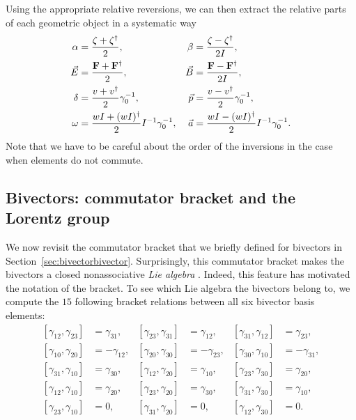 \documentclass[1p,sort&compress]{elsarticle}
\numberwithin{equation}{section}
\newcommand{\rv}[1]{\vec{#1}}
\newcommand{\bv}[1]{\mathbf{#1}}
\begin{document}
Using the appropriate relative reversions, we can then extract the relative parts of each geometric object in a systematic way
\begin{align}
  \alpha &= \frac{\zeta + \zeta^\dagger}{2}, & \beta &= \frac{\zeta - \zeta^\dagger}{2 I}, \\ \relax
  \rv{E} &= \frac{\bv{F} + \bv{F}^\dagger}{2}, & \rv{B} &= \frac{\bv{F} - \bv{F}^\dagger}{2 I}, \nonumber \\ \relax
  \delta &= \frac{v + v^\dagger}{2} \gamma_0^{-1}, & \rv{p} &= \frac{v - v^\dagger}{2}\gamma_0^{-1}, \nonumber \\ \relax
  \omega &= \frac{wI + (wI)^\dagger}{2}I^{-1}\gamma_0^{-1}, & \rv{a} &= \frac{wI - (wI)^\dagger}{2}I^{-1}\gamma_0^{-1}. \nonumber 
\end{align}
Note that we have to be careful about the order of the inversions in the case when elements do not commute.


\subsection{Bivectors: commutator bracket and the Lorentz group}\label{sec:lorentz}


We now revisit the commutator bracket that we briefly defined for bivectors in Section~\ref{sec:bivectorbivector}.  Surprisingly, this commutator bracket makes the bivectors a closed nonassociative \emph{Lie algebra} \cite{Hestenes1987}.  Indeed, this feature has motivated the notation of the bracket.  To see which Lie algebra the bivectors belong to, we compute the $15$ following bracket relations between all six bivector basis elements:
\begin{align}\label{eq:bivectorbrackets}
  [\gamma_{12},\gamma_{23}] &= \gamma_{31}, & [\gamma_{23},\gamma_{31}] &= \gamma_{12}, & [\gamma_{31},\gamma_{12}] &= \gamma_{23}, \\ 
  [\gamma_{10},\gamma_{20}] &= - \gamma_{12}, & [\gamma_{20},\gamma_{30}] &= -\gamma_{23}, & [\gamma_{30},\gamma_{10}] &= -\gamma_{31}, \nonumber \\ 
  [\gamma_{31},\gamma_{10}] &= \gamma_{30}, & [\gamma_{12},\gamma_{20}] &= \gamma_{10}, & [\gamma_{23},\gamma_{30}] &= \gamma_{20}, \nonumber \\ 
  [\gamma_{12},\gamma_{10}] &= \gamma_{20}, & [\gamma_{23},\gamma_{20}] &= \gamma_{30}, & [\gamma_{31},\gamma_{30}] &= \gamma_{10}, \nonumber \\
  [\gamma_{23},\gamma_{10}] &= 0, & [\gamma_{31},\gamma_{20}] &= 0, & [\gamma_{12},\gamma_{30}] &= 0. \nonumber
\end{align}
\end{document}
